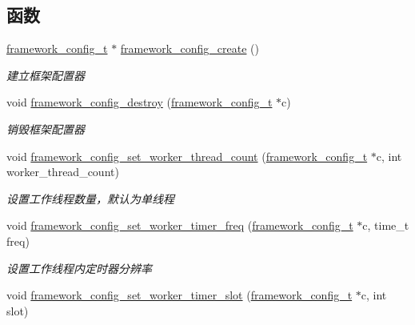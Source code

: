\subsection*{函数}
\begin{DoxyCompactItemize}
\item 
\hyperlink{a00051_a55b26efa9e6ee05514d087ba2593a54b_a55b26efa9e6ee05514d087ba2593a54b}{framework\+\_\+config\+\_\+t} $\ast$ \hyperlink{a00055_a86930a2422f44672a2ddde80fb6a5b5a_a86930a2422f44672a2ddde80fb6a5b5a}{framework\+\_\+config\+\_\+create} ()
\begin{DoxyCompactList}\small\item\em 建立框架配置器 \end{DoxyCompactList}\item 
void \hyperlink{a00055_a4a798f64988a0fe651e2f247acae55b2_a4a798f64988a0fe651e2f247acae55b2}{framework\+\_\+config\+\_\+destroy} (\hyperlink{a00051_a55b26efa9e6ee05514d087ba2593a54b_a55b26efa9e6ee05514d087ba2593a54b}{framework\+\_\+config\+\_\+t} $\ast$c)
\begin{DoxyCompactList}\small\item\em 销毁框架配置器 \end{DoxyCompactList}\item 
void \hyperlink{a00104_ga46fc5d54c72138bced5ddd4068ef77e5_ga46fc5d54c72138bced5ddd4068ef77e5}{framework\+\_\+config\+\_\+set\+\_\+worker\+\_\+thread\+\_\+count} (\hyperlink{a00051_a55b26efa9e6ee05514d087ba2593a54b_a55b26efa9e6ee05514d087ba2593a54b}{framework\+\_\+config\+\_\+t} $\ast$c, int worker\+\_\+thread\+\_\+count)
\begin{DoxyCompactList}\small\item\em 设置工作线程数量，默认为单线程 \end{DoxyCompactList}\item 
void \hyperlink{a00104_gab1d3f9bfc5762af2d1f5fbc50cd1c8c5_gab1d3f9bfc5762af2d1f5fbc50cd1c8c5}{framework\+\_\+config\+\_\+set\+\_\+worker\+\_\+timer\+\_\+freq} (\hyperlink{a00051_a55b26efa9e6ee05514d087ba2593a54b_a55b26efa9e6ee05514d087ba2593a54b}{framework\+\_\+config\+\_\+t} $\ast$c, time\+\_\+t freq)
\begin{DoxyCompactList}\small\item\em 设置工作线程内定时器分辨率 \end{DoxyCompactList}\item 
void \hyperlink{a00104_gae9dc5208c9840b3476df89ad16ef3897_gae9dc5208c9840b3476df89ad16ef3897}{framework\+\_\+config\+\_\+set\+\_\+worker\+\_\+timer\+\_\+slot} (\hyperlink{a00051_a55b26efa9e6ee05514d087ba2593a54b_a55b26efa9e6ee05514d087ba2593a54b}{framework\+\_\+config\+\_\+t} $\ast$c, int slot)

\end{DoxyCompactItemize}
